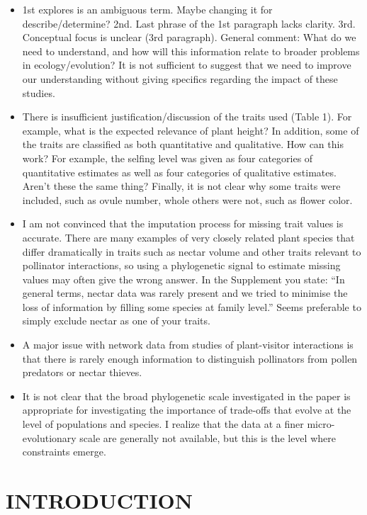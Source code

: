 \documentclass[
  12pt,
  a4paper,
]{article}
\begin{document}
\begin{itemize}
\item
  1st explores is an ambiguous term. Maybe changing it for describe/determine? 2nd. Last phrase of the 1st paragraph lacks clarity. 3rd. Conceptual focus is unclear (3rd paragraph). General comment: What do we need to understand, and how will this information relate to broader problems in ecology/evolution? It is not sufficient to suggest that we need to improve our understanding without giving specifics regarding the impact of these studies.
\item
  There is insufficient justification/discussion of the traits used (Table 1). For example, what is the expected relevance of plant height? In addition, some of the traits are classified as both quantitative and qualitative. How can this work? For example, the selfing level was given as four categories of quantitative estimates as well as four categories of qualitative estimates. Aren't these the same thing? Finally, it is not clear why some traits were included, such as ovule number, whole others were not, such as flower color.
\item
  I am not convinced that the imputation process for missing trait values is accurate. There are many examples of very closely related plant species that differ dramatically in traits such as nectar volume and other traits relevant to pollinator interactions, so using a phylogenetic signal to estimate missing values may often give the wrong answer. In the Supplement you state: ``In general terms, nectar data was rarely present and we tried to minimise the loss of information by filling some species at family level.'' Seems preferable to simply exclude nectar as one of your traits.
\item
  A major issue with network data from studies of plant-visitor interactions is that there is rarely enough information to distinguish pollinators from pollen predators or nectar thieves.
\item
  It is not clear that the broad phylogenetic scale investigated in the paper is appropriate for investigating the importance of trade-offs that evolve at the level of populations and species. I realize that the data at a finer micro-evolutionary scale are generally not available, but this is the level where constraints emerge.
\end{itemize}

\hypertarget{introduction}{%
\section{INTRODUCTION}\label{introduction}}
\end{document}
